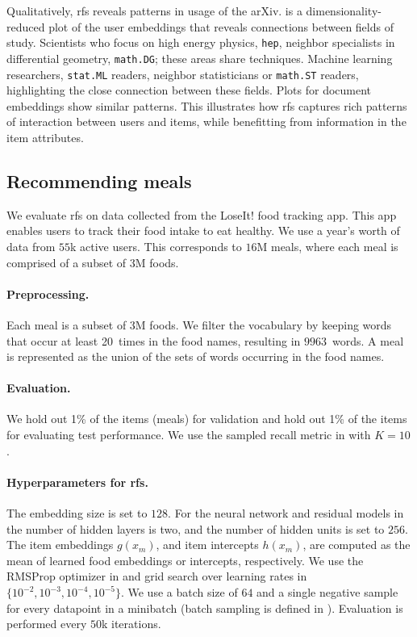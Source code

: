 Qualitatively, \gls{rfs} reveals patterns in usage of the arXiv.
 is a dimensionality-reduced plot of the user embeddings
that reveals connections between fields of study. Scientists who focus on high
energy physics, \texttt{hep}, neighbor specialists in differential geometry,
\texttt{math.DG}; these areas share techniques. Machine learning researchers,
\texttt{stat.ML} readers, neighbor statisticians or \texttt{math.ST} readers,
highlighting the close connection between these fields. Plots for document
embeddings show similar patterns. This illustrates how \gls{rfs}
captures rich patterns of interaction between users and items, while benefitting
from information in the item attributes.

\subsection{Recommending meals}
\label{sec:experiments_meals}

We evaluate \gls{rfs} on data collected from the LoseIt! food tracking app. This
app enables users to track their food intake to eat healthy. We use a year's
worth of data from $55$k active users. This corresponds to $16$M meals, where
each meal is comprised of a subset of $3$M foods.

\paragraph{Preprocessing.} Each meal is a subset of $3$M foods. We filter the
vocabulary by keeping words that occur at least 20~times in the food names,
resulting in $9963$~words. A meal is represented as the union of the sets of
words occurring in the food names.

\paragraph{Evaluation.} We hold out 1\% of the items (meals) for validation and
hold out 1\% of the items for evaluating test performance. We use the sampled
recall metric in  with $K=10$. 




\paragraph{Hyperparameters for \gls{rfs}.} The embedding size is set to $128$.
For the neural network and residual models in
 the number of hidden layers is two, and
the number of hidden units is set to $256$. The item embeddings $g(x_m)$, and
item intercepts $h(x_m)$, are computed as the mean of learned food embeddings or
intercepts, respectively. We use the RMSProp optimizer in
\citet{graves2013generating} and grid search over learning rates in
$\{10^{-2}, 10^{-3}, 10^{-4}, 10^{-5}\}$. We use a batch size of $64$ and a
single negative sample for every datapoint in a minibatch (batch sampling is
defined in ). Evaluation is
performed every $50$k iterations.

